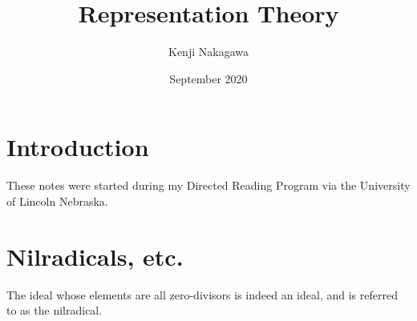 \documentclass{article}
\title{Representation Theory}
\author{Kenji Nakagawa}
\date{September 2020}
\begin{document}
\maketitle
\tableofcontents

\section*{Introduction}
These notes were started during my Directed Reading Program via the University of Lincoln Nebraska. 

\section{Nilradicals, etc.}

The ideal whose elements are all zero-divisors is indeed an ideal, and is referred to as the nilradical.
\end{document}

